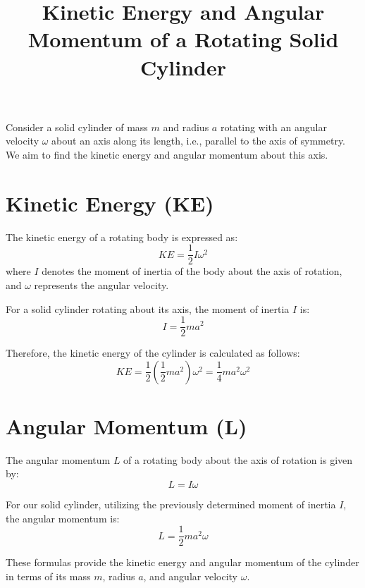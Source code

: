 \documentclass{article}
\begin{document}
\title{Kinetic Energy and Angular Momentum of a Rotating Solid Cylinder}
\date{}
\maketitle

Consider a solid cylinder of mass $m$ and radius $a$ rotating with an angular velocity $\omega$ about an axis along its length, i.e., parallel to the axis of symmetry. We aim to find the kinetic energy and angular momentum about this axis.

\section*{Kinetic Energy (KE)}

The kinetic energy of a rotating body is expressed as:
\[ KE = \frac{1}{2} I \omega^2 \]
where $I$ denotes the moment of inertia of the body about the axis of rotation, and $\omega$ represents the angular velocity.

For a solid cylinder rotating about its axis, the moment of inertia $I$ is:
\[ I = \frac{1}{2} m a^2 \]

Therefore, the kinetic energy of the cylinder is calculated as follows:
\[ KE = \frac{1}{2} \left(\frac{1}{2} m a^2\right) \omega^2 = \frac{1}{4} m a^2 \omega^2 \]

\section*{Angular Momentum (L)}

The angular momentum $L$ of a rotating body about the axis of rotation is given by:
\[ L = I \omega \]

For our solid cylinder, utilizing the previously determined moment of inertia $I$, the angular momentum is:
\[ L = \frac{1}{2} m a^2 \omega \]

These formulas provide the kinetic energy and angular momentum of the cylinder in terms of its mass $m$, radius $a$, and angular velocity $\omega$.
\end{document}
